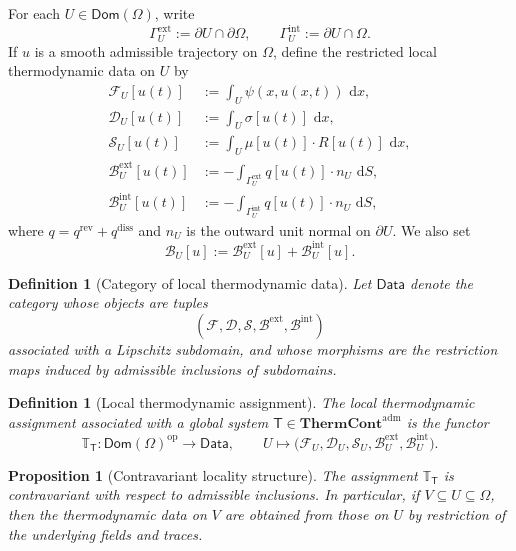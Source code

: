 \documentclass[10pt,a4paper]{amsart}
\newtheorem{proposition}[theorem]{Proposition}
\newtheorem{definition}[theorem]{Definition}
\newcommand{\Om}{\Omega}
\newcommand{\pa}{\partial}
\newcommand{\dd}{\,\mathrm{d}}
\newcommand{\F}{\mathcal{F}}
\newcommand{\Diss}{\mathcal{D}}
\newcommand{\Bnd}{\mathcal{B}}
\newcommand{\Src}{\mathcal{S}}
\newcommand{\ThermAdm}{\mathbf{ThermCont}^{\mathrm{adm}}}
\begin{document}
For each \(U\in \mathsf{Dom}(\Om)\), write
\[
\Gamma_U^{\mathrm{ext}}:=\pa U\cap \pa\Om,
\qquad
\Gamma_U^{\mathrm{int}}:=\pa U\cap \Om.
\]
If \(u\) is a smooth admissible trajectory on \(\Om\), define the restricted local
thermodynamic data on \(U\) by
\begin{align}
\F_U[u(t)]
&:=
\int_U \psi(x,u(x,t))\,\dd x,\label{eq:F-U}\\
\Diss_U[u(t)]
&:=
\int_U \sigma[u(t)]\,\dd x,\label{eq:D-U}\\
\Src_U[u(t)]
&:=
\int_U \mu[u(t)]\cdot R[u(t)]\,\dd x,\label{eq:S-U}\\
\Bnd_U^{\mathrm{ext}}[u(t)]
&:=
-\int_{\Gamma_U^{\mathrm{ext}}} q[u(t)]\cdot n_U\,\dd S,\label{eq:B-U-ext}\\
\Bnd_U^{\mathrm{int}}[u(t)]
&:=
-\int_{\Gamma_U^{\mathrm{int}}} q[u(t)]\cdot n_U\,\dd S,\label{eq:B-U-int}
\end{align}
where \(q=q^{\mathrm{rev}}+q^{\mathrm{diss}}\) and \(n_U\) is the outward unit normal
on \(\pa U\). We also set
\begin{equation}\label{eq:B-U-total}
\Bnd_U[u]:=\Bnd_U^{\mathrm{ext}}[u]+\Bnd_U^{\mathrm{int}}[u].
\end{equation}

\begin{definition}[Category of local thermodynamic data]
Let \(\mathsf{Data}\) denote the category whose objects are tuples
\[
(\F,\Diss,\Src,\Bnd^{\mathrm{ext}},\Bnd^{\mathrm{int}})
\]
associated with a Lipschitz subdomain, and whose morphisms are the restriction maps
induced by admissible inclusions of subdomains.
\end{definition}

\begin{definition}[Local thermodynamic assignment]
The \emph{local thermodynamic assignment} associated with a global system
\(\mathsf{T}\in\ThermAdm\) is the functor
\[
\mathbb{T}_{\mathsf{T}}:\mathsf{Dom}(\Om)^{\mathrm{op}}\to \mathsf{Data},
\qquad
U\mapsto
\bigl(\F_U,\Diss_U,\Src_U,\Bnd_U^{\mathrm{ext}},\Bnd_U^{\mathrm{int}}\bigr).
\]
\end{definition}

\begin{proposition}[Contravariant locality structure]\label{prop:local-assignment}
The assignment \(\mathbb{T}_{\mathsf{T}}\) is contravariant with respect to
admissible inclusions. In particular, if \(V\subseteq U\subseteq \Om\), then the
thermodynamic data on \(V\) are obtained from those on \(U\) by restriction of the
underlying fields and traces.
\end{proposition}
\end{document}
